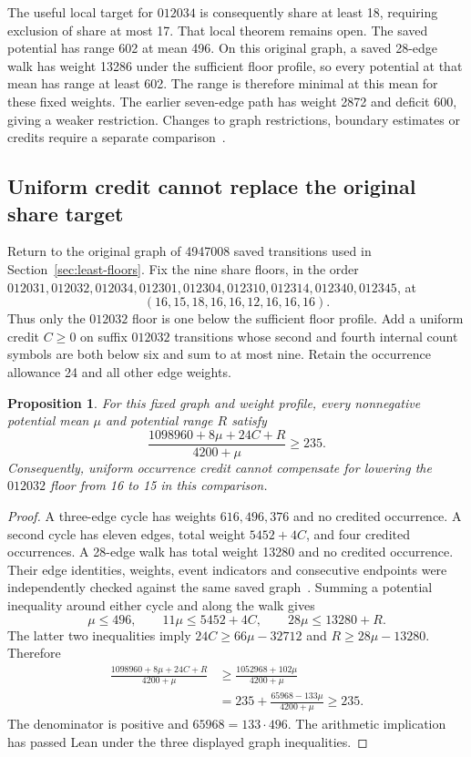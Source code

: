 \documentclass[11pt,a4paper]{article}
\newtheorem{proposition}[theorem]{Proposition}
\theoremstyle{definition}
\theoremstyle{remark}
\begin{document}
The useful local target for $012034$ is consequently share at least 18,
requiring exclusion of share at most 17. That local theorem remains open.
The saved potential has range 602 at mean 496. On this original graph, a
saved 28-edge walk has weight 13286 under the sufficient floor profile,
so every potential at that mean has range at least 602. The range is
therefore minimal at this mean for these fixed weights. The earlier
seven-edge path has weight 2872 and deficit 600, giving a weaker restriction.
Changes to graph restrictions, boundary estimates or credits require a
separate comparison~\cite{range156archive}.

\subsection{Uniform credit cannot replace the original share target}
\label{sec:share-credit-tradeoff}
Return to the original graph of 4947008 saved transitions used in
Section~\ref{sec:least-floors}. Fix the nine share floors, in the order
$012031,012032,012034,012301,012304,012310,012314,012340,012345$, at
\[
(16,15,18,16,16,12,16,16,16).
\]
Thus only the $012032$ floor is one below the sufficient floor profile.
Add a uniform credit $C\ge0$ on suffix $012032$ transitions whose second
and fourth internal count symbols are both below six and sum to at most
nine. Retain the occurrence allowance 24 and all other edge weights.

\begin{proposition}\label{prop:share15-credit-obstruction}
For this fixed graph and weight profile, every nonnegative potential mean
$\mu$ and potential range $R$ satisfy
\[
\frac{1098960+8\mu+24C+R}{4200+\mu}\ge235.
\]
Consequently, uniform occurrence credit cannot compensate for lowering
the $012032$ floor from 16 to 15 in this comparison.
\end{proposition}
\begin{proof}
A three-edge cycle has weights $616,496,376$ and no credited occurrence.
A second cycle has eleven edges, total weight $5452+4C$, and four credited
occurrences. A 28-edge walk has total weight 13280 and no credited occurrence.
Their edge identities, weights, event indicators and consecutive endpoints
were independently checked against the same saved graph~\cite{credittradeoffarchive}.
Summing a potential inequality around either cycle and along the walk gives
\[
\mu\le496,\qquad 11\mu\le5452+4C,\qquad 28\mu\le13280+R.
\]
The latter two inequalities imply $24C\ge66\mu-32712$ and
$R\ge28\mu-13280$. Therefore
\[
\begin{aligned}
\frac{1098960+8\mu+24C+R}{4200+\mu}
&\ge\frac{1052968+102\mu}{4200+\mu}\\
&=235+\frac{65968-133\mu}{4200+\mu}\ge235.
\end{aligned}
\]
The denominator is positive and $65968=133\cdot496$. The arithmetic
implication has passed Lean under the three displayed graph inequalities.
\end{proof}
\end{document}
